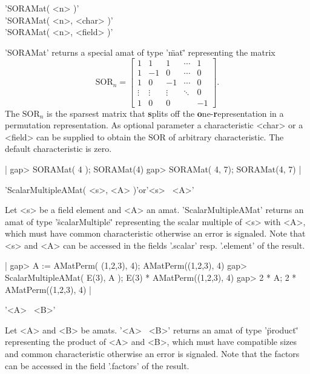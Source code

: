 
'SORAMat( <n> )'\\
'SORAMat( <n>, <char> )'\\
'SORAMat( <n>, <field> )'

'SORAMat' returns a special amat of type '\"mat\"' representing the 
matrix 
$$
\mbox{SOR}_n = \left[
  \begin{array}{rrrrr}
  1 & 1 & 1 &\cdots & 1 \\
  1 & -1 & 0 & \cdots & 0 \\
  1 & 0 & -1 & \cdots & 0 \\
  \vdots & \vdots & \vdots& \ddots & 0 \\
  1 & 0 & 0 & & -1
  \end{array}\right].
$$
The $\mbox{SOR}_n$ is the sparsest matrix that {\bf s}plits off the
{\bf o}ne-{\bf r}epresentation in a permutation representation. As
optional parameter a characteristic <char> or a <field> can be
supplied to obtain the $\mbox{SOR}$ of arbitrary characteristic. The
default characteristic is zero.

|    gap> SORAMat( 4 );   
    SORAMat(4)
    gap> SORAMat( 4, 7); 
    SORAMat(4, 7) |


'ScalarMultipleAMat( <s>, <A> )'\quad or\quad '<s> \*\ <A>'

Let <s> be a field element and <A> an amat. 
'ScalarMultipleAMat' returns an amat of type '\"scalarMultiple\"'
representing the scalar multiple of <s> with <A>, which must have
common characteristic otherwise an error is signaled. 
Note that <s> and <A> can be accessed in the fields '.scalar'
resp. '.element' of the result.

|    gap> A := AMatPerm( (1,2,3), 4);
    AMatPerm((1,2,3), 4)
    gap> ScalarMultipleAMat( E(3), A );
    E(3) * AMatPerm((1,2,3), 4)
    gap> 2 * A;
    2 * AMatPerm((1,2,3), 4) |


'<A> \*\ <B>'

Let <A> and <B> be amats. '<A> \*\ <B>' returns an amat of
type '\"product\"' representing the product of <A> and <B>,
which must have compatible sizes and common characteristic
otherwise an error is signaled.
Note that the factors can be accessed in the field 
'.factors' of the result.

